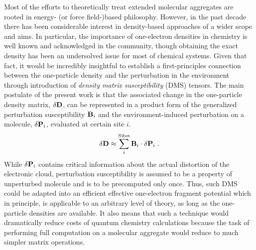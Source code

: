 \documentclass[aip,amsmath,amssymb,reprint,floatfix]{revtex4-1}
\begin{document}
Most of the efforts to theoretically treat extended molecular aggregates are rooted in 
energy\hyp{} (or force field\hyp{})based philosophy. However,
in the past decade there has been considerable interest in density\hyp{}based approaches
of a wider scope and aims.\cite{Piquemal.Cisneros.Reinhardt.Gresh.Darden.JCP.2006,
Mandado.Hermida-Ramon.JCTC.2011,
Sun.Chan.ACR.2016,
Hedegard.Reiher.JCTC.2016} 
In particular, the importance of
one\hyp{}electron densities in chemistry is well known and acknowledged in the community,\cite{Holas.March.PhysRevA.1991}
though obtaining the exact density has been an undersolved issue for most of chemical systems.
Given that fact, it would be incredibly insightful 
to establish a first\hyp{}principles connection between the one\hyp{}particle
density and the perturbation in the environment through introduction of
\emph{density matrix susceptibility} (DMS) tensors. 
The main postulate of the present work is that the associated change 
in the one\hyp{}particle density matrix, $\delta {\bf D}$, can be
represented in a product form of the generalized perturbation susceptibility ${\bf B}_i$
and the environment\hyp{}induced perturbation on a molecule, $\delta {\bf P}_i$,
evaluated at certain site $i$.
%
\begin{equation*} \label{e:initial-model}
  \delta {\bf D} \approx \sum_i^{\text{Sites}} {\bf B}_i
  \cdot  \delta {\bf P}_i \;.
\end{equation*}
%
While $\delta {\bf P}_i$ contains critical information 
about the actual distortion of the electronic cloud,
perturbation susceptibility is assumed to be a property of unperturbed 
molecule and is to be precomputed only once. 
Thus, such DMS could be adapted into an efficient effective 
one\hyp{}electron fragment potential which in principle, is applicable to an arbitrary
level of theory, as long as the one\hyp{}particle densities are available.
It also means that such a technique would dramatically reduce costs of quantum chemistry calculations
because the task of performing full computation on a molecular aggregate
would reduce to much simpler matrix operations.
\end{document}
